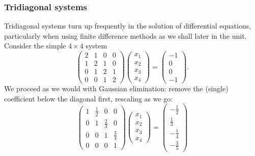 \documentclass{beamer}
\begin{document}
\begin{frame}
  \frametitle{Tridiagonal systems}

  \begin{overlayarea}{\textwidth}{0.8\textheight}
    {
      Tridiagonal systems turn up frequently in the solution of
      differential equations, particularly when using finite
      difference methods as we shall later in the unit.
    }
    {
      Consider the simple $4 \times 4$ system
      \begin{equation*}
        \begin{pmatrix}
          2 & 1 & 0 & 0 \\
          1 & 2 & 1 & 0 \\
          0 & 1 & 2 & 1 \\
          0 & 0 & 1 & 2
        \end{pmatrix}
        \begin{pmatrix}
          x_1 \\ x_2 \\ x_3 \\ x_4
        \end{pmatrix}
        =
        \begin{pmatrix}
          -1 \\ 0 \\ 0 \\ -1
        \end{pmatrix}.
      \end{equation*}
    }
    {
      We proceed as we would with Gaussian elimination: remove the
      (single) coefficient below the diagonal first, rescaling as we
      go:
      \begin{equation*}
        \begin{pmatrix}
          1 & \tfrac{1}{2} & 0 & 0 \\
          0 & 1 & \frac{2}{3} & 0 \\
          0 & 0 & 1 & \tfrac{3}{4} \\
          0 & 0 & 0 & 1
        \end{pmatrix}
        \begin{pmatrix}
          x_1 \\ x_2 \\ x_3 \\ x_4
        \end{pmatrix}
        =
        \begin{pmatrix}
          -\tfrac{1}{2} \\ \tfrac{1}{3} \\ -\tfrac{1}{4} \\ -\tfrac{3}{5}

\end{pmatrix}
\end{equation*}}
\end{overlayarea}
\end{frame}
\end{document}
